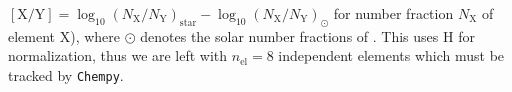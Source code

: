 \documentclass{aa}
\begin{document}
    $[\mathrm{X}/\mathrm{Y}] = \log_{10}(N_\mathrm X/N_\mathrm Y)_\mathrm{star} - \log_{10}(N_\mathrm X/N_\mathrm Y)_\odot$
for number fraction $N_\mathrm X$ of element X), where $\odot$ denotes the solar number fractions of \citet{2009ARA&A..47..481A}. This uses H for normalization, thus we are left with $n_\mathrm{el}=8$ independent elements which must be tracked by \texttt{Chempy}.%
\end{document}
